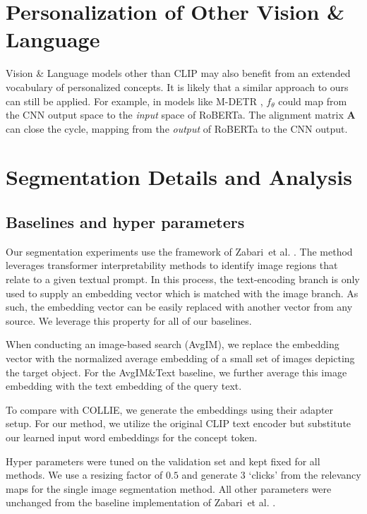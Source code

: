 \documentclass[runningheads]{llncs}
\renewcommand\vec[1]{\mathbf{#1}}
\newcommand{\A}{\vec{A}}
\newcommand{\etal}{{{et al}. }}
\begin{document}
\section{Personalization of Other Vision \& Language}
\label{approch_extension}
Vision \& Language models other than CLIP may also benefit from an extended vocabulary of personalized concepts. It is likely that a similar approach to ours can still be applied. For example, in models like M-DETR \cite{kamath2021mdetr}, $f_\theta$ could map from the CNN output space to the \textit{input} space of RoBERTa. The alignment matrix $\A$ can close the cycle, mapping from the \textit{output} of RoBERTa to the CNN output.

\section{Segmentation Details and Analysis}

\subsection{Baselines and hyper parameters}

Our segmentation experiments use the framework of Zabari~\etal\cite{zabari2021semantic}. The method leverages transformer interpretability methods to identify image regions that relate to a given textual prompt. In this process, the text-encoding branch is only used to supply an embedding vector which is matched with the image branch. As such, the embedding vector can be easily replaced with another vector from any source. We leverage this property for all of our baselines.

When conducting an image-based search (AvgIM), we replace the embedding vector with the normalized average embedding of a small set of images depicting the target object. For the AvgIM\&Text baseline, we further average this image embedding with the text embedding of the query text.

To compare with COLLIE, we generate the embeddings using their adapter setup. For our method, we utilize the original CLIP text encoder but substitute our learned input word embeddings for the concept token.

Hyper parameters were tuned on the validation set and kept fixed for all methods. We use a resizing factor of $0.5$ and generate $3$ `clicks' from the relevancy maps for the single image segmentation method. All other parameters were unchanged from the baseline implementation of Zabari~\etal\cite{zabari2021semantic}.
\end{document}
